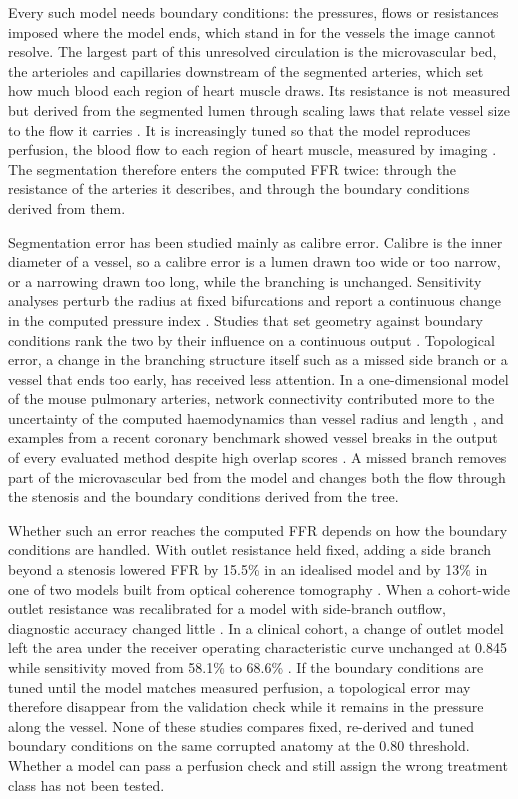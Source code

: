 \documentclass[journal]{IEEEtran}
\begin{document}
Every such model needs boundary conditions: the pressures, flows or resistances imposed where the model ends, which
stand in for the vessels the image cannot resolve. The largest part of this unresolved circulation is the
microvascular bed, the arterioles and capillaries downstream of the segmented arteries, which set how much blood
each region of heart muscle draws. Its resistance is not measured but derived from the segmented lumen through
scaling laws that relate vessel size to the flow it carries \cite{murray1926,kim2010}. It is increasingly tuned so
that the model reproduces perfusion, the blood flow to each region of heart muscle, measured by imaging
\cite{menon2024}. The segmentation therefore enters the computed FFR twice: through the resistance of
the arteries it describes, and through the boundary conditions derived from them.

Segmentation error has been studied mainly as calibre error. Calibre is the inner diameter of a vessel, so a calibre error is a lumen drawn too wide or too narrow, or a narrowing drawn too long, while the branching is unchanged. Sensitivity analyses perturb the radius at fixed bifurcations and report a continuous change in the computed pressure index \cite{sankaran2015tmi,sankaran2015cmame,fernandez2024,dalmaso2025}. Studies that set geometry against
boundary conditions rank the two by their influence on a continuous output \cite{sankaran2016,tanade2022,korte2023}. Topological error, a change in the branching structure itself such as a missed side branch or a vessel that ends too early, has received less attention. In a one-dimensional model of the mouse pulmonary arteries, network connectivity contributed more to the uncertainty of the computed haemodynamics than vessel radius and length \cite{colebank2019}, and examples from a recent coronary benchmark showed vessel breaks in the output of every evaluated method despite high overlap scores \cite{bransby2026}. A missed branch removes part of the microvascular bed from the model and changes both the flow
through the stenosis and the boundary conditions derived from the tree.

Whether such an error reaches the computed FFR depends on how the boundary conditions are handled. With outlet resistance held fixed, adding a side branch beyond a stenosis lowered FFR by 15.5\% in an idealised model and by 13\% in one of two models built from optical coherence tomography \cite{gamage2022}. When a cohort-wide outlet resistance was recalibrated for a model with side-branch outflow, diagnostic accuracy changed little \cite{gosling2020}. In a clinical cohort, a change of outlet
model left the area under the receiver operating characteristic curve unchanged at 0.845 while sensitivity moved
from 58.1\% to 68.6\% \cite{fossan2026}. If the boundary conditions are tuned until the model matches measured
perfusion, a topological error may therefore disappear from the validation check while it remains in the pressure
along the vessel. None of these studies compares fixed, re-derived and tuned boundary conditions on the same
corrupted anatomy at the 0.80 threshold. Whether a model can pass a perfusion check and still assign the wrong
treatment class has not been tested.
\end{document}
